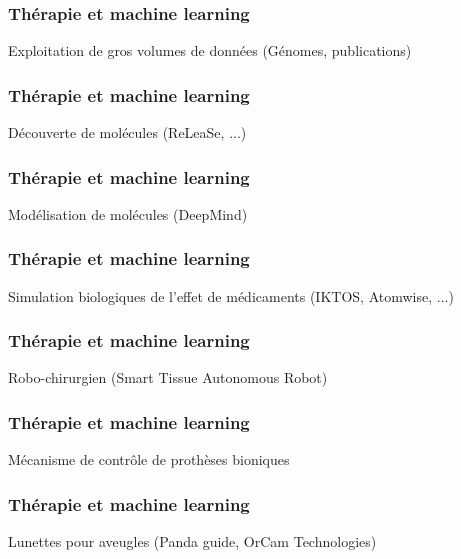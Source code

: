 \documentclass{formation}
\begin{document}
\begin{frame}
  \frametitle{Thérapie et machine learning}
  Exploitation de gros volumes de données (Génomes, publications)
  \newline
  \newline
  \begin{minipage}[c]{0.49\linewidth}
  \end{minipage}\hfill
  \begin{minipage}[c]{0.49\linewidth}
  \end{minipage}\hfill
\end{frame}


\begin{frame}
  \frametitle{Thérapie et machine learning}
  Découverte de molécules (ReLeaSe, ...) 
\end{frame}

\begin{frame}
  \frametitle{Thérapie et machine learning}
  Modélisation de molécules (DeepMind)
\end{frame}

\begin{frame}
  \frametitle{Thérapie et machine learning}
  \begin{minipage}[c]{0.49\linewidth}
    Simulation biologiques de l'effet de médicaments (IKTOS, Atomwise, ...)
  \end{minipage}\hfill
  \begin{minipage}[c]{0.49\linewidth}
  \end{minipage}\hfill
\end{frame}

\begin{frame}
  \frametitle{Thérapie et machine learning}
  Robo-chirurgien (Smart Tissue Autonomous Robot)
\end{frame}

\begin{frame}
  \frametitle{Thérapie et machine learning}
  Mécanisme de contrôle de prothèses bioniques
\end{frame}

\begin{frame}
  \frametitle{Thérapie et machine learning}
  Lunettes pour aveugles (Panda guide, OrCam Technologies)
\end{frame}
\end{document}
